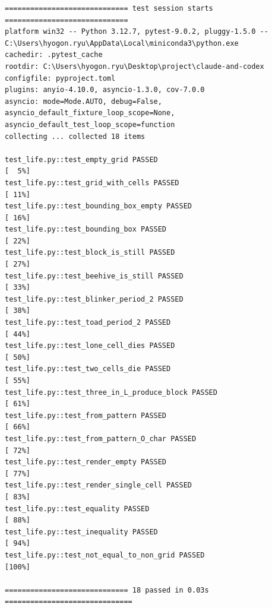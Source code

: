 \documentclass[11pt,a4paper]{article}
\begin{document}
\begin{lstlisting}
============================= test session starts =============================
platform win32 -- Python 3.12.7, pytest-9.0.2, pluggy-1.5.0 -- C:\Users\hyogon.ryu\AppData\Local\miniconda3\python.exe
cachedir: .pytest_cache
rootdir: C:\Users\hyogon.ryu\Desktop\project\claude-and-codex
configfile: pyproject.toml
plugins: anyio-4.10.0, asyncio-1.3.0, cov-7.0.0
asyncio: mode=Mode.AUTO, debug=False, asyncio_default_fixture_loop_scope=None, asyncio_default_test_loop_scope=function
collecting ... collected 18 items

test_life.py::test_empty_grid PASSED                                     [  5%]
test_life.py::test_grid_with_cells PASSED                                [ 11%]
test_life.py::test_bounding_box_empty PASSED                             [ 16%]
test_life.py::test_bounding_box PASSED                                   [ 22%]
test_life.py::test_block_is_still PASSED                                 [ 27%]
test_life.py::test_beehive_is_still PASSED                               [ 33%]
test_life.py::test_blinker_period_2 PASSED                               [ 38%]
test_life.py::test_toad_period_2 PASSED                                  [ 44%]
test_life.py::test_lone_cell_dies PASSED                                 [ 50%]
test_life.py::test_two_cells_die PASSED                                  [ 55%]
test_life.py::test_three_in_L_produce_block PASSED                       [ 61%]
test_life.py::test_from_pattern PASSED                                   [ 66%]
test_life.py::test_from_pattern_O_char PASSED                            [ 72%]
test_life.py::test_render_empty PASSED                                   [ 77%]
test_life.py::test_render_single_cell PASSED                             [ 83%]
test_life.py::test_equality PASSED                                       [ 88%]
test_life.py::test_inequality PASSED                                     [ 94%]
test_life.py::test_not_equal_to_non_grid PASSED                          [100%]

============================= 18 passed in 0.03s ==============================
\end{lstlisting}
\end{document}
